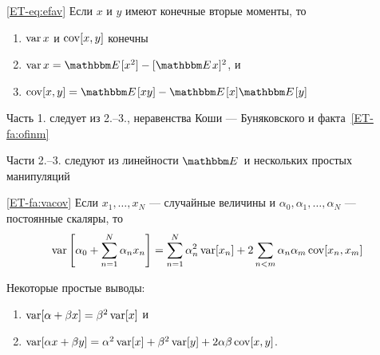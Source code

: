 \begin{frame}

    \vspace{2em}
    \Fact\eqref{ET-eq:efav}
    Если $x$ и $y$ имеют конечные вторые моменты, то
    \begin{enumerate}
        \item $\operatorname{var} x$ и $\operatorname{cov}[x, y]$ конечны
        \item $\var x = \EE [x^2] - [\EE x]^2$, и
        \item $\cov[x, y] = \EE [ xy] -\EE[x] \EE[y]$
    \end{enumerate}

    Часть 1. следует из 2.--3., неравенства Коши — Буняковского и
    факта~\ref{ET-fa:ofinm}
    
    Части 2.--3. следуют из линейности $\EE$ и
    нескольких простых манипуляций

\end{frame}

\begin{frame}

    \vspace{2em}
    \Fact\eqref{ET-fa:vacov}
    Если $x_1,\ldots,x_N$ --- случайные величины и 
    $\alpha_0, \alpha_1,\ldots,\alpha_N$ --- постоянные скаляры, то
    \begin{equation*}
        \operatorname{var} \left[ \alpha_0 + \sum_{n=1}^N \alpha_n x_n \right]
        =  \sum_{n=1}^N \alpha_n^2 \operatorname{var}[ x_n ]   
                + 2 \sum_{n < m} \alpha_n \alpha_m \operatorname{cov}[x_n, x_m] 
    \end{equation*}
    
    \vspace{1em}
    Некоторые простые выводы:
    \begin{enumerate}
        \item $\operatorname{var}[\alpha + \beta x] = \beta^2 \operatorname{var}[x]$ и
        \item $\operatorname{var}[\alpha x + \beta y] = \alpha^2 \operatorname{var}[x] + \beta^2 \operatorname{var}[y] + 2
            \alpha \beta \operatorname{cov}[x,y]$.
    \end{enumerate}
    
\end{frame}

